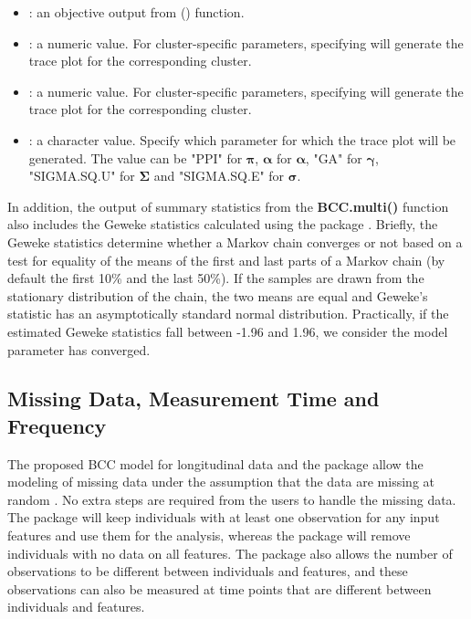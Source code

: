 \begin{itemize}

	\item {}: an objective output from () function.  

	\item {}: a numeric value. For cluster-specific parameters, specifying  will generate the trace plot for the corresponding cluster. 

	\item {}: a numeric value. For cluster-specific parameters, specifying  will generate the trace plot for the corresponding cluster. 

	\item {}: a character value. Specify which parameter for which the trace plot will be generated. The value can be "PPI" for $\boldsymbol{\pi}$, $\boldsymbol{\alpha}$ for $\boldsymbol{\alpha}$, "GA" for $\boldsymbol{\gamma}$, "SIGMA.SQ.U" for $\boldsymbol{\Sigma}$ and "SIGMA.SQ.E" for  $\boldsymbol{\sigma}$.

\end{itemize}

In addition, the output of summary statistics from the \textbf{BCC.multi()} function also includes the Geweke statistics calculated using the  package \citep{Martyn2006}. Briefly, the Geweke statistics determine whether a Markov chain converges or not based on a test for equality of the means of the first and last parts of a Markov chain (by default the first 10\% and the last 50\%). If the samples are drawn from the stationary distribution of the chain, the two means are equal and Geweke's statistic has an asymptotically standard normal distribution. Practically, if the estimated Geweke statistics fall between -1.96 and 1.96, we consider the model parameter has converged. 

\subsection{Missing Data, Measurement Time and Frequency}

The proposed BCC model for longitudinal data and the  package allow the modeling of missing data under the assumption that the data are missing at random \citep{Lu2022, Tan2022a}. No extra steps are required from the users to handle the missing data. The package will keep individuals with at least one observation for any input features and use them for the analysis, whereas the package will remove individuals with no data on all features. The package also allows the number of observations to be different between individuals and features, and these observations can also be measured at time points that are different between individuals and features.

